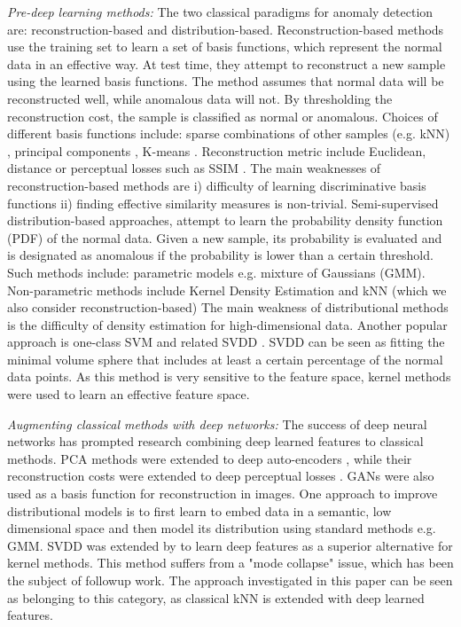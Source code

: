 \documentclass{article}
\begin{document}
\textit{Pre-deep learning methods:} The two classical paradigms for anomaly detection are: reconstruction-based and distribution-based. Reconstruction-based methods use the training set to learn a set of basis functions, which represent the normal data in an effective way. At test time, they attempt to reconstruct a new sample using the learned basis functions. The method assumes that normal data will be reconstructed well, while anomalous data will not. By thresholding the reconstruction cost, the sample is classified as normal or anomalous. Choices of different basis functions include: sparse combinations of other samples (e.g. kNN) \citep{eskin2002geometric}, principal components \citep{jolliffe2011principal, candes2011robust}, K-means \citep{hartigan1979algorithm}. Reconstruction metric include Euclidean,  distance or perceptual losses such as SSIM \cite{wang2004image}. The main weaknesses of reconstruction-based methods are i) difficulty of learning discriminative basis functions ii) finding effective similarity measures is non-trivial. Semi-supervised distribution-based approaches, attempt to learn the probability density function (PDF) of the normal data. Given a new sample, its probability is evaluated and is designated as anomalous if the probability is lower than a certain threshold. Such methods include: parametric models e.g. mixture of Gaussians (GMM). Non-parametric methods include Kernel Density Estimation \cite{latecki2007outlier} and kNN \cite{eskin2002geometric} (which we also consider reconstruction-based) The main weakness of distributional methods is the difficulty of density estimation for high-dimensional data. Another popular approach is one-class SVM \citep{scholkopf2000support} and related SVDD \cite{tax2004support}. SVDD can be seen as fitting the minimal volume sphere that includes at least a certain percentage of the normal data points. As this method is very sensitive to the feature space, kernel methods were used to learn an effective feature space.

\textit{Augmenting classical methods with deep networks:} The success of deep neural networks has prompted research combining deep learned features to classical methods. PCA methods were extended to deep auto-encoders \cite{yang2017towards}, while their reconstruction costs were extended to deep perceptual losses \cite{zhang2018unreasonable}. GANs were also used as a basis function for reconstruction in images. One approach \cite{zong2018deep} to improve distributional models is to first learn to embed data in a semantic, low dimensional space and then model its distribution using standard methods e.g. GMM. SVDD was extended by \citet{ruff2018deep} to learn deep features as a superior alternative for kernel methods. This method suffers from a "mode collapse" issue, which has been the subject of followup work. The approach investigated in this paper can be seen as belonging to this category, as classical kNN is extended with deep learned features.
\end{document}
